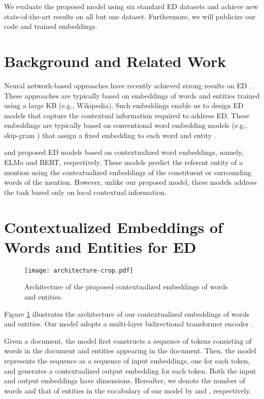 \documentclass[11pt,a4paper]{article}
\begin{document}
We evaluate the proposed model using six standard ED datasets and achieve new state-of-the-art results on all but one dataset.
Furthermore, we will publicize our code and trained embeddings.

\section{Background and Related Work}
Neural network-based approaches have recently achieved strong results on ED \cite{ganea-hofmann:2017:EMNLP2017,TACL1065,le-titov-2018-improving,cao-EtAl:2018:C18-1,le-titov-2019-boosting,yang2019learning}.
These approaches are typically based on embeddings of words and entities trained using a large KB (e.g., Wikipedia).
Such embeddings enable us to design ED models that capture the contextual information required to address ED.
These embeddings are typically based on conventional word embedding models (e.g., skip-gram \cite{Mikolov2013}) that assign a fixed embedding to each word and entity \cite{Yamada2016,cao-EtAl:2017:Long1,ganea-hofmann:2017:EMNLP2017}.

 and  proposed ED models based on contextualized word embeddings, namely, ELMo \cite{peters-etal-2018-deep} and BERT, respectively.
These models predict the referent entity of a mention using the contextualized embeddings of the constituent or surrounding words of the mention.
However, unlike our proposed model, these models address the task based only on local contextual information.

\section{Contextualized Embeddings of Words and Entities for ED}
\label{sec:embedding-model}

\begin{figure}[t]
  \centering
  \texttt{[image: architecture-crop.pdf]}
  \caption{Architecture of the proposed contextualized embeddings of words and entities.}
  \label{fig:architecture}
\end{figure}

Figure \ref{fig:architecture} illustrates the architecture of our contextualized embeddings of words and entities.
Our model adopts a multi-layer bidirectional transformer encoder \cite{NIPS2017_7181}.

Given a document, the model first constructs a sequence of tokens consisting of words in the document and entities appearing in the document.
Then, the model represents the sequence as a sequence of input embeddings, one for each token, and generates a contextualized output embedding for each token.
Both the input and output embeddings have  dimensions.
Hereafter, we denote the number of words and that of entities in the vocabulary of our model by  and , respectively.
\end{document}
